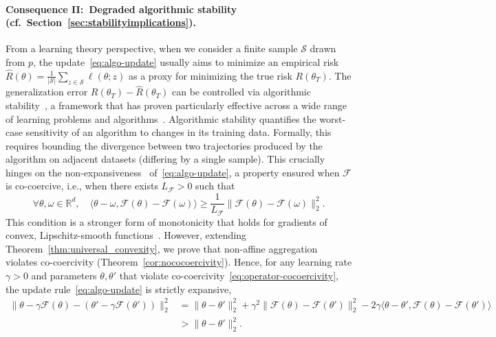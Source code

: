 \documentclass[twoside,11pt]{article}
\newcommand\mc{\mathcal}
\newcommand{\R}{\mathbb{R}}
\newcommand{\F}{\mathcal{F}}
\begin{document}
\paragraph{Consequence II:\ Degraded algorithmic stability (cf.~Section~\ref{sec:stabilityimplications}).}
From a learning theory perspective, when we consider a finite sample $\mc{S}$ drawn from $p$, the update~\eqref{eq:algo-update} usually aims to minimize an empirical risk $\widehat{R}(\theta) = \frac{1}{|\mc{S}|} \sum_{z\in\mc{S}} \ell(\theta;z)$ as a proxy for minimizing the true risk $R(\theta_T)$. 
The generalization error $R(\theta_T) - \widehat{R}(\theta_T)$ can be controlled via algorithmic stability~\citep{Bousquet2002StabilityAG,pmlr-v125-bousquet20b}, a framework that has proven particularly effective across a wide range of learning problems and algorithms~\citep{hardt2016train,bassily2019private,schliserman2022stability,boudou2025generalization}. 
Algorithmic stability quantifies the worst-case sensitivity of an algorithm to changes in its training data. 
Formally, this requires bounding the divergence between two trajectories produced by the algorithm on adjacent datasets (differing by a single sample).
This crucially hinges on the non-expansiveness~\citep[Definition 2.3]{hardt2016train} of~\eqref{eq:algo-update}, a property ensured when $\F$ is co-coercive, i.e., when there exists $L_\F > 0$ such that
\begin{equation}\label{eq:operator-cocoercivity}
    \forall \theta, \omega \in \R^d,\quad \langle \theta - \omega, \F(\theta) - \F(\omega) \rangle \geq \frac{1}{L_\F} \| \F(\theta) - \F(\omega) \|_2^2.
\end{equation} 
This condition is a stronger form of monotonicity that holds for gradients of convex, Lipschitz-smooth functions~\citep[e.g.,][Proposition 5.4]{bach-ltfp}.
However, extending Theorem~\ref{thm:universal_convexity}, we prove that non-affine aggregation violates co-coercivity (Theorem~\ref{cor:nococoercivity}).
Hence, for any learning rate $\gamma > 0$ and parameters $\theta, \theta'$ that violate co-coercivity~\eqref{eq:operator-cocoercivity}, the update rule~\eqref{eq:algo-update} is strictly expansive,
\begin{align*}
    \| \theta - \gamma \F(\theta) - (\theta' - \gamma \F(\theta')) \|_2^2 
    &= \| \theta - \theta' \|_2^2
    + \gamma^2 \| \F(\theta) - \F(\theta') \|_2^2
    - 2 \gamma \langle \theta - \theta', \F(\theta) - \F(\theta') \rangle \\
    &> \| \theta - \theta' \|_2^2.
\end{align*}
\end{document}
